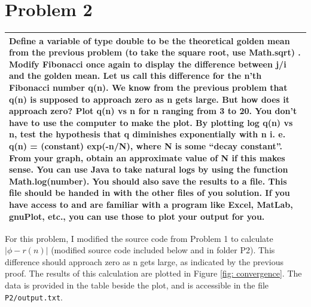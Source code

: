 \documentclass[aps,letterpaper,10pt]{article}
\newcommand{\ttt}{\texttt}
\begin{document}
\newpage
\section{Problem 2}
\begin{center}
\begin{minipage}{.85\linewidth}
\begin{tabular}{|p{\linewidth}|}
\hline
Define a variable of type double to be the theoretical golden mean from the previous problem (to take the square root, use Math.sqrt) . Modify Fibonacci once again to display the difference between j/i and the golden mean.  Let us call this difference for the n'th Fibonacci number q(n).  We know from the previous problem that q(n) is supposed to approach zero as n gets large.  But how does it approach zero?  Plot q(n) vs n for n ranging from 3 to 20.  You don't have to use the computer to make the plot.  By plotting log q(n) vs n, test the hypothesis that q diminishes exponentially with n i. e. q(n) = (constant) exp(-n/N), where N is some ``decay constant''.  From your graph, obtain an approximate value of N if this makes sense.  You can use Java to take natural logs by using the function Math.log(number). 
You should also save the results to a file. This file should be handed in with the other files of you solution. If you have access to and are familiar with a program like Excel, MatLab, gnuPlot, etc., you can use those to plot your output for you.\\
\hline
\end{tabular}
\end{minipage}
\end{center}

For this problem, I modified the source code from Problem 1 to calculate $|\phi - r(n)|$ (modified source code included below and in folder P2). This difference should approach zero as n gets large, as indicated by the previous proof. The results of this calculation are plotted in Figure \ref{fig: convergence}. The data is provided in the table beside the plot, and is accessible in the file \ttt{P2/output.txt}. 
\end{document}
